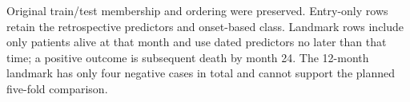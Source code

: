 \begin{table}[ht!]
\centering\small
\caption[Study II supplementary cohort sizes]{Study II supplementary cohort sizes}
\label{tab:review_s2_timed_cohorts}
\setlength{\tabcolsep}{4pt}
\par\smallskip
\begin{minipage}{0.98\linewidth}\footnotesize
Original train/test membership and ordering were preserved. Entry-only rows retain the retrospective predictors and onset-based class. Landmark rows include only patients alive at that month and use dated predictors no later than that time; a positive outcome is subsequent death by month 24. The 12-month landmark has only four negative cases in total and cannot support the planned five-fold comparison.
\end{minipage}
\end{table}
